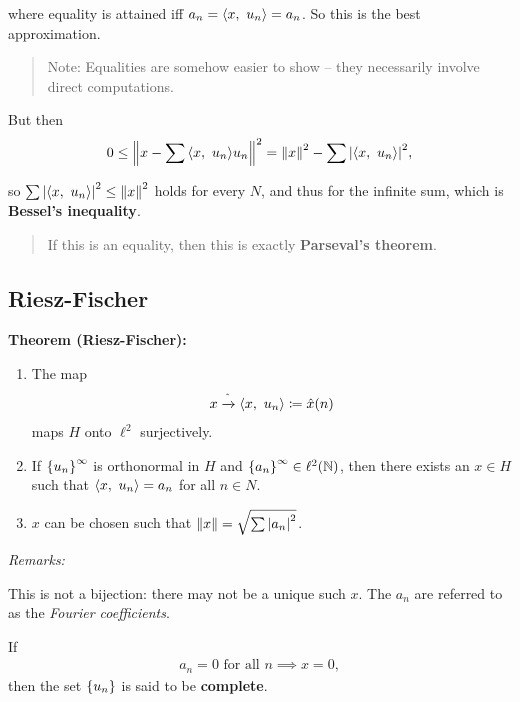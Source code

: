 where equality is attained iff \(a_n = {\left\langle {x},~{u_n} \right\rangle} = a_n\). So this
is the best approximation.

\begin{quote}
Note: Equalities are somehow easier to show -- they necessarily involve
direct computations.
\end{quote}

But then
\begin{align*}
0 \leq {\left\lVert {x - \sum {\left\langle {x},~{u_n} \right\rangle} u_n} \right\rVert}^2 = {\left\lVert {x} \right\rVert}^2 - \sum {\left\lvert {{\left\langle {x},~{u_n} \right\rangle}} \right\rvert}^2,
\end{align*}

so \(\sum {\left\lvert {{\left\langle {x},~{u_n} \right\rangle}} \right\rvert}^2 \leq {\left\lVert {x} \right\rVert}^2\) holds for every
\(N\), and thus for the infinite sum, which is \textbf{Bessel's
inequality}.

\begin{quote}
If this is an equality, then this is exactly \textbf{Parseval's
theorem}.
\end{quote}

\hypertarget{riesz-fischer}{%
\subsection{Riesz-Fischer}\label{riesz-fischer}}

\textbf{Theorem (Riesz-Fischer):}

\begin{enumerate}
\def\labelenumi{\arabic{enumi}.}
\item
  The map
  \begin{align*}
  x \xrightarrow{ \hat{} } {\left\langle {x},~{u_n} \right\rangle} \coloneqq \hat{x}(n)
  \end{align*} maps \(H\) onto \(\ell^2\) surjectively.
\item
  If \(\left\{{u_n}\right\}^\infty\) is orthonormal in \(H\) and
  \(\left\{{a_n}\right\}^\infty \in \ell^2({\mathbb{N}})\), then there exists an
  \(x\in H\) such that \({\left\langle {x},~{u_n} \right\rangle} = a_n\) for all \(n\in N\).
\item
  \(x\) can be chosen such that \({\left\lVert {x} \right\rVert} = \sqrt{\sum {\left\lvert {a_n} \right\rvert}^2}\).
\end{enumerate}

\emph{Remarks:}

This is not a bijection: there may not be a unique such \(x\). The
\(a_n\) are referred to as the \emph{Fourier coefficients}.

If
\begin{align*}
a_n = 0 \text{ for all } n \implies x=0
,\end{align*} then the set \(\left\{{u_n}\right\}\) is said to be
\textbf{complete}.

